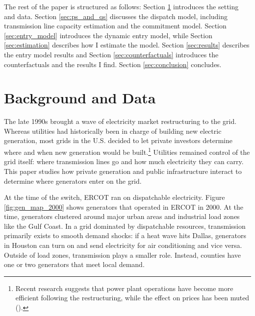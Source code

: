 \documentclass[12pt]{article}
\begin{document}
The rest of the paper is structured as follows: Section \ref{sec:background} introduces the setting and data. Section \ref{sec:ps_and_qs} discusses the dispatch model, including transmission line capacity estimation and the commitment model. Section \ref{sec:entry_model} introduces the dynamic entry model, while Section \ref{sec:estimation} describes how I estimate the model. Section \ref{sec:results} describes the entry model results and Section \ref{sec:counterfactuals} introduces the counterfactuals and the results I find. Section \ref{sec:conclusion} concludes.

\section{Background and Data}
\label{sec:background}
The late 1990s brought a wave of electricity market restructuring to the grid. Whereas utilities had historically been in charge of building new electric generation, most grids in the U.S. decided to let private investors determine where and when new generation would be built.\footnote{Recent research suggests that power plant operations have become more efficient following the restructuring, while the effect on prices has been muted (\cite{BorensteinBushnell2015}).} Utilities remained control of the grid itself: where transmission lines go and how much electricity they can carry. This paper studies how private generation and public infrastructure interact to determine where generators enter on the grid.

At the time of the switch, ERCOT ran on dispatchable electricity. Figure \ref{fig:gen_map_2000} shows generators that operated in ERCOT in 2000. At the time, generators clustered around major urban areas and industrial load zones like the Gulf Coast. In a grid dominated by dispatchable resources, transmission primarily exists to smooth demand shocks: if a heat wave hits Dallas, generators in Houston can turn on and send electricity for air conditioning and vice versa. Outside of load zones, transmission plays a smaller role. Instead, counties have one or two generators that meet local demand. 
\end{document}
